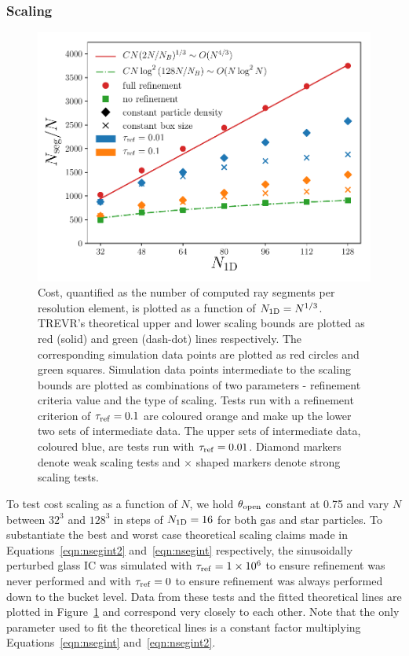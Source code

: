 \documentclass[fleq,usenatbib]{mnras}
\newcommand{\acro}{TREVR}
\providecommand{\e}[1]{\ensuremath{\times10^{#1}}}
\newcommand{\tr}{\tau_{\rm ref}}
\newcommand{\tO}{\theta_{\rm open}}
\begin{document}
{\subsubsection{Scaling}
\begin{figure}
\includegraphics[width=1\linewidth]{Figures/particle_scaling.pdf}
\caption{Cost, quantified as the number of computed ray segments per 
resolution element, is plotted as a function of $N_{\rm 1D} = N^{1/3}$. 
\acro{}'s theoretical upper and lower scaling bounds are plotted as red 
(solid) and green (dash-dot) lines respectively. The corresponding simulation 
data points are plotted as red circles and green squares. Simulation data 
points intermediate to the scaling bounds are plotted as combinations of two 
parameters - refinement criteria value and the type of scaling. Tests run 
with a refinement criterion of $\tr=0.1$ are coloured orange and make up the 
lower two sets of intermediate data. The upper sets of intermediate data, 
coloured blue, are tests run with $\tr=0.01$. Diamond markers denote weak 
scaling tests and $\times$ shaped markers denote strong scaling tests.}
\label{fig:pscale}
\end{figure}
To test cost scaling as a function of $N$, we hold $\tO$ constant at 0.75 and
vary $N$ between $32^3$ and $128^3$ in steps of $N_{\rm 1D} = 16$ for both gas 
and star particles. To substantiate the best and worst case theoretical 
scaling claims made in Equations~\ref{eqn:nsegint2} and~\ref{eqn:nsegint} 
respectively, the sinusoidally perturbed glass IC was simulated with 
$\tr=1\e 6$ to ensure refinement was never performed and with $\tr=0$ to 
ensure refinement was always performed down to the bucket level. Data from 
these tests and the fitted theoretical lines are plotted in 
Figure~\ref{fig:pscale} and correspond very closely to each other. Note that 
the only parameter used to fit the theoretical lines is a constant factor 
multiplying Equations~\ref{eqn:nsegint} and~\ref{eqn:nsegint2}.

}
\end{document}
